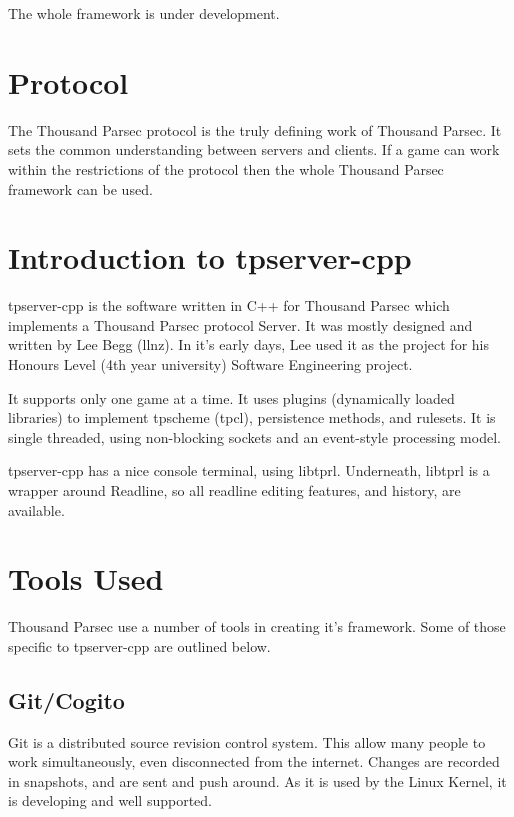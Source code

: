 \documentclass[a4paper,11pt]{report}
\begin{document}
The whole framework is under development.

\chapter{Protocol}
\label{chap:protocol-intro}

The Thousand Parsec protocol is the truly defining work of Thousand Parsec. It sets the common understanding between servers and clients. If a game can work within the restrictions of the protocol then the whole Thousand Parsec framework can be used.

\chapter{Introduction to tpserver-cpp}
\label{chap:tpserver-cpp-intro}
tpserver-cpp is the software written in C++ for Thousand Parsec which implements a Thousand Parsec protocol Server. It was mostly designed and written by Lee Begg (llnz). In it's early days, Lee used it as the project for his Honours Level (4th year university) Software Engineering project.

It supports only one game at a time. It uses plugins (dynamically loaded libraries) to implement tpscheme (tpcl), persistence methods, and rulesets. It is single threaded, using non-blocking sockets and an event-style processing model.

tpserver-cpp has a nice console terminal, using libtprl. Underneath, libtprl is a wrapper around Readline, so all readline editing features, and history, are available.

\chapter{Tools Used}
\label{chap:tools}

Thousand Parsec use a number of tools in creating it's framework. Some of those specific to tpserver-cpp are outlined below.

\section{Git/Cogito}
\label{sec:git}

Git is a distributed source revision control system. This allow many people to work simultaneously, even disconnected from the internet. Changes are recorded in snapshots, and are sent and push around. As it is used by the Linux Kernel, it is developing and well supported.
\end{document}
